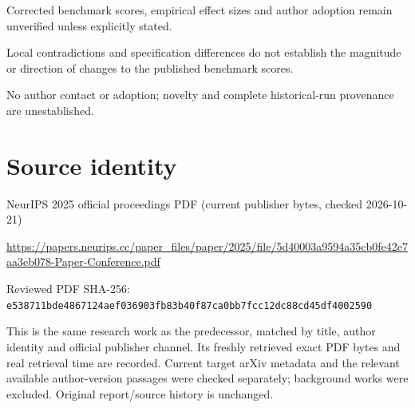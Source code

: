 \documentclass[11pt]{article}
\begin{document}
Corrected benchmark scores, empirical effect sizes and author adoption remain unverified unless explicitly stated.\par

Local contradictions and specification differences do not establish the magnitude or direction of changes to the published benchmark scores.\par

No author contact or adoption; novelty and complete historical-run provenance are unestablished.\par

\section*{Source identity}

NeurIPS 2025 official proceedings PDF (current publisher bytes, checked 2026-10-21)

\url{https://papers.neurips.cc/paper_files/paper/2025/file/5d40003a9594a35cb0fe42e7aa3eb078-Paper-Conference.pdf}

Reviewed PDF SHA-256: \nolinkurl{e538711bde4867124aef036903fb83b40f87ca0bb7fcc12dc88cd45df4002590}

This is the same research work as the predecessor, matched by title, author identity and official publisher channel. Its freshly retrieved exact PDF bytes and real retrieval time are recorded. Current target arXiv metadata and the relevant available author-version passages were checked separately; background works were excluded. Original report/source history is unchanged.
\end{document}
